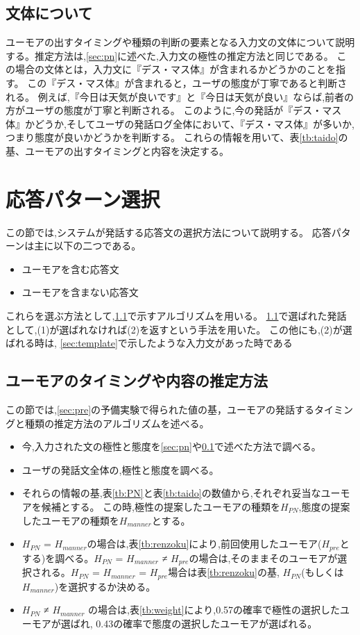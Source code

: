 \subsection{文体について}\label{sec:tai}
ユーモアの出すタイミングや種類の判断の要素となる入力文の文体について説明する。推定方法は,\ref{sec:pn}に述べた,入力文の極性の推定方法と同じである。
この場合の文体とは，入力文に『デス・マス体』が含まれるかどうかのことを指す。
この『デス・マス体』が含まれると，ユーザの態度が丁寧であると判断される。
例えば,『今日は天気が良いです』と『今日は天気が良い』ならば,前者の方がユーザの態度が丁寧と判断される。
このように,今の発話が『デス・マス体』かどうか,そしてユーザの発話ログ全体において、『デス・マス体』が多いか,つまり態度が良いかどうかを判断する。
これらの情報を用いて、表\ref{tb:taido}の基、ユーモアの出すタイミングと内容を決定する。




\section{応答パターン選択}
この節では,システムが発話する応答文の選択方法について説明する。
応答パターンは主に以下の二つである。
\begin{itemize}
\item [(1)]ユーモアを含む応答文
\item [(2)]ユーモアを含まない応答文
\end{itemize}
これらを選ぶ方法として,\ref{sec:timing}で示すアルゴリズムを用いる。
\ref{sec:timing}で選ばれた発話として,(1)が選ばれなければ(2)を返すという手法を用いた。
この他にも,(2)が選ばれる時は, \ref{sec:template}で示したような入力文があった時である






\subsection{ユーモアのタイミングや内容の推定方法}\label{sec:timing}
この節では,\ref{sec:pre}の予備実験で得られた値の基，ユーモアの発話するタイミングと種類の推定方法のアルゴリズムを述べる。
\begin{itemize}

\item [(1)]今,入力された文の極性と態度を\ref{sec:pn}や\ref{sec:tai}で述べた方法で調べる。
\item [(2)]ユーザの発話文全体の,極性と態度を調べる。
\item [(3)]それらの情報の基,表\ref{tb:PN}と表\ref{tb:taido}の数値から,それぞれ妥当なユーモアを候補とする。
この時,極性の提案したユーモアの種類を$H_{PN}$,態度の提案したユーモアの種類を$H_{manner}$とする。
\item [(4)]$H_{PN}$ = $H_{manner}$の場合は,表\ref{tb:renzoku}により,前回使用したユーモア($H_{pre}$とする)を調べる。$H_{PN}$ = $H_{manner}$ ≠ $H_{pre}$の場合は,そのままそのユーモアが選択される。$H_{PN}$ = $H_{manner}$ = $H_{pre}$場合は表\ref{tb:renzoku}の基,
$H_{PN}$(もしくは$H_{manner}$)を選択するか決める。
\item [(5)]$H_{PN}$ ≠ $H_{manner}$ の場合は,表\ref{tb:weight}により,0.57の確率で極性の選択したユーモアが選ばれ, 0.43の確率で態度の選択したユーモアが選ばれる。
\end{itemize}

